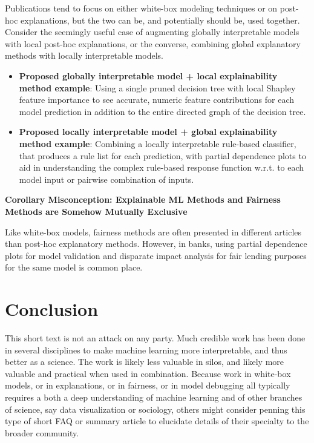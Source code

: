 \documentclass{article}
\begin{document}
Publications tend to focus on either white-box modeling techniques or on post-hoc explanations, but the two can be, and potentially should be, used together. Consider the seemingly useful case of augmenting globally interpretable models with local post-hoc explanations, or the converse, combining global explanatory methods with locally interpretable models.

\begin{itemize}
\item \textbf{Proposed globally interpretable model + local explainability method example}: Using a single pruned decision tree with local Shapley feature importance to see accurate, numeric feature contributions for each model prediction in addition to the entire directed graph of the decision tree.
\item \textbf{Proposed locally interpretable model + global explainability method example}: Combining a locally interpretable rule-based classifier, that produces a rule list for each prediction, with partial dependence plots to aid in understanding the complex rule-based response function w.r.t. to each model input or pairwise combination of inputs.  
\end{itemize}

\textbf{Corollary Misconception: Explainable ML Methods and Fairness Methods are Somehow Mutually Exclusive}

Like white-box models, fairness methods are often presented in different articles than post-hoc explanatory methods. However, in banks, using partial dependence plots for model validation and disparate impact analysis for fair lending purposes for the same model is common place.

\section{Conclusion}

This short text is not an attack on any party. Much credible work has been done in several disciplines to make machine learning more interpretable, and thus better as a science. The work is likely less valuable in silos, and likely more valuable and practical when used in combination. Because work in white-box models, or in explanations, or in fairness, or in model debugging all typically requires a both a deep understanding of machine learning and of other branches of science, say data visualization or sociology, others might consider penning this type of short FAQ or summary article to elucidate details of their specialty to the broader community.    




\end{document}
